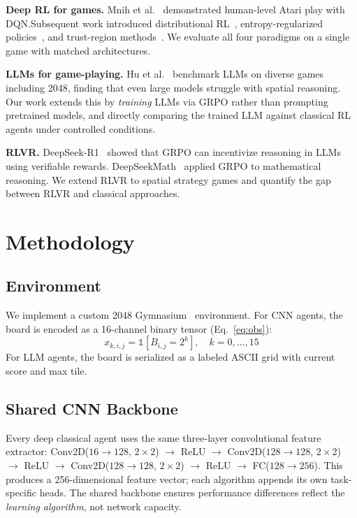 \documentclass[letterpaper]{article}
\begin{document}
\textbf{Deep RL for games.}
Mnih et al.~\cite{mnih2015human} demonstrated human-level Atari play with DQN.\@ Subsequent work introduced distributional RL~\cite{dabney2018distributional}, entropy-regularized policies~\cite{haarnoja2018soft}, and trust-region methods~\cite{schulman2017proximal}. We evaluate all four paradigms on a single game with matched architectures.

\textbf{LLMs for game-playing.}
Hu et al.~\cite{hu2025lmgame} benchmark LLMs on diverse games including 2048, finding that even large models struggle with spatial reasoning. Our work extends this by \emph{training} LLMs via GRPO rather than prompting pretrained models, and directly comparing the trained LLM against classical RL agents under controlled conditions.

\textbf{RLVR.}
DeepSeek-R1~\cite{guo2025deepseek} showed that GRPO can incentivize reasoning in LLMs using verifiable rewards. DeepSeekMath~\cite{shao2024deepseekmath} applied GRPO to mathematical reasoning. We extend RLVR to spatial strategy games and quantify the gap between RLVR and classical approaches.

\section{Methodology}
\label{sec:method}

\subsection{Environment}

We implement a custom 2048 Gymnasium~\cite{towers2024gymnasium} environment. For CNN agents, the board is encoded as a 16-channel binary tensor (Eq.~\ref{eq:obs}):
\begin{equation}
    x_{k,i,j} = \mathbb{1}[B_{i,j} = 2^k], \quad k=0,\ldots,15
    \label{eq:obs}
\end{equation}
For LLM agents, the board is serialized as a labeled ASCII grid with current score and max tile.

\subsection{Shared CNN Backbone}

Every deep classical agent uses the same three-layer convolutional feature extractor: Conv2D($16 \to 128$, $2{\times}2$) $\to$ ReLU $\to$ Conv2D($128 \to 128$, $2{\times}2$) $\to$ ReLU $\to$ Conv2D($128 \to 128$, $2{\times}2$) $\to$ ReLU $\to$ FC($128 \to 256$). This produces a 256-dimensional feature vector; each algorithm appends its own task-specific heads. The shared backbone ensures performance differences reflect the \emph{learning algorithm}, not network capacity.
\end{document}
